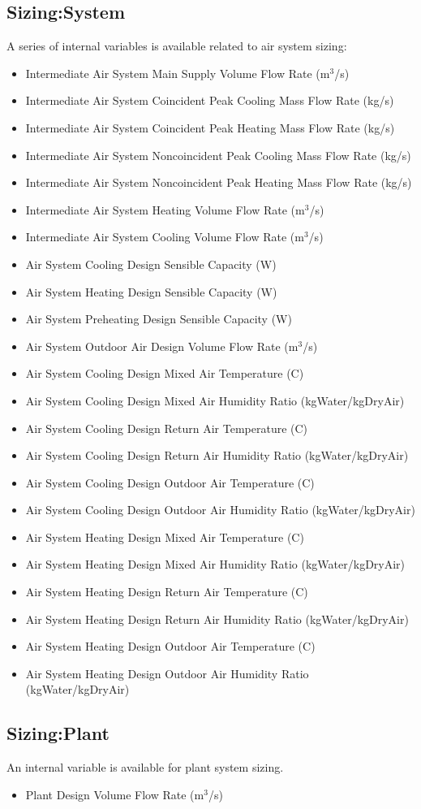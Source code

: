 \subsection{Sizing:System}\label{sizingsystem}

A series of internal variables is available related to air system sizing:

\begin{itemize}
\item
  Intermediate Air System Main Supply Volume Flow Rate (m\(^{3}\)/s)
\item
  Intermediate Air System Coincident Peak Cooling Mass Flow Rate (kg/s)
\item
  Intermediate Air System Coincident Peak Heating Mass Flow Rate (kg/s)
\item
  Intermediate Air System Noncoincident Peak Cooling Mass Flow Rate (kg/s)
\item
  Intermediate Air System Noncoincident Peak Heating Mass Flow Rate (kg/s)
\item
  Intermediate Air System Heating Volume Flow Rate (m\(^{3}\)/s)
\item
  Intermediate Air System Cooling Volume Flow Rate (m\(^{3}\)/s)
\item
  Air System Cooling Design Sensible Capacity (W)
\item
  Air System Heating Design Sensible Capacity (W)
\item
  Air System Preheating Design Sensible Capacity (W)
\item
  Air System Outdoor Air Design Volume Flow Rate (m\(^{3}\)/s)
\item
  Air System Cooling Design Mixed Air Temperature (C)
\item
  Air System Cooling Design Mixed Air Humidity Ratio (kgWater/kgDryAir)
\item
  Air System Cooling Design Return Air Temperature (C)
\item
  Air System Cooling Design Return Air Humidity Ratio (kgWater/kgDryAir)
\item
  Air System Cooling Design Outdoor Air Temperature (C)
\item
  Air System Cooling Design Outdoor Air Humidity Ratio (kgWater/kgDryAir)
\item
  Air System Heating Design Mixed Air Temperature (C)
\item
  Air System Heating Design Mixed Air Humidity Ratio (kgWater/kgDryAir)
\item
  Air System Heating Design Return Air Temperature (C)
\item
  Air System Heating Design Return Air Humidity Ratio (kgWater/kgDryAir)
\item
  Air System Heating Design Outdoor Air Temperature (C)
\item
  Air System Heating Design Outdoor Air Humidity Ratio (kgWater/kgDryAir)
\end{itemize}

\subsection{Sizing:Plant}\label{sizingplant}

An internal variable is available for plant system sizing.

\begin{itemize}
\tightlist
\item
  Plant Design Volume Flow Rate (m\(^{3}\)/s)
\end{itemize}
